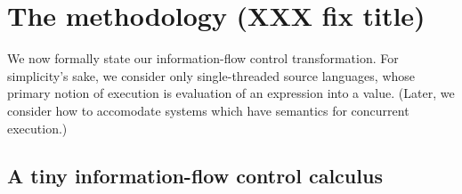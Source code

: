 \section{The methodology (XXX fix title)}
\label{sec:methodology}

We now formally state our information-flow control transformation.  For
simplicity's sake, we consider only single-threaded source languages,
whose primary notion of execution is evaluation of an expression into a
value.  (Later, we consider how to accomodate systems which have
semantics for concurrent execution.)

\subsection{A tiny information-flow control calculus}

